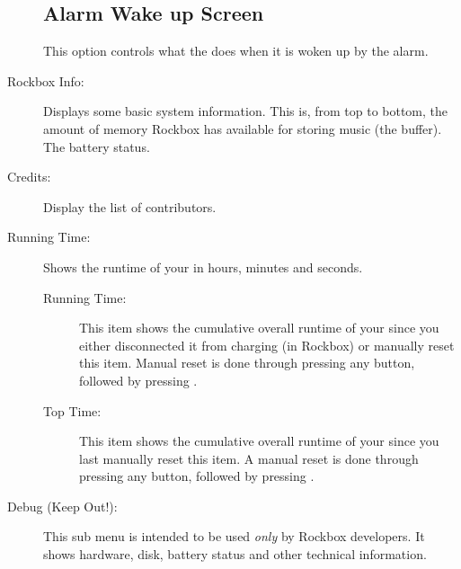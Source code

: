 \begin{description}
{\begin{description}
{{            \subsection{Alarm Wake up Screen}
            This option controls what the \dap{} does when it is woken up by the alarm.
        }
      }
    \end{description}
}
\item[Rockbox Info:]
  Displays some basic system information. This is, from top to bottom,
  the amount of memory Rockbox has available for storing music (the buffer).
  The battery status.
%

\item[Credits:]
  Display the list of contributors.


\item[Running Time:]
  Shows the runtime of your \dap{} in hours, minutes and seconds.
  \begin{description}
    \item[Running Time:]
        This item shows the cumulative overall runtime of your \dap{} since you 
        either disconnected it from charging (in Rockbox) or manually 
        reset this item. Manual reset is done through pressing any button, 
        followed by pressing \ButtonSelect{}.
    \item[Top Time:]
        This item shows the cumulative overall runtime of your \dap{} since you 
        last manually reset this item. A manual reset is done through pressing 
        any button, followed by pressing \ButtonSelect{}.
  \end{description}

\item[Debug (Keep Out!):]
  This sub menu is intended to be used \emph{only} by Rockbox developers.
  It shows hardware, disk, battery status and other technical information.  
\end{description}

